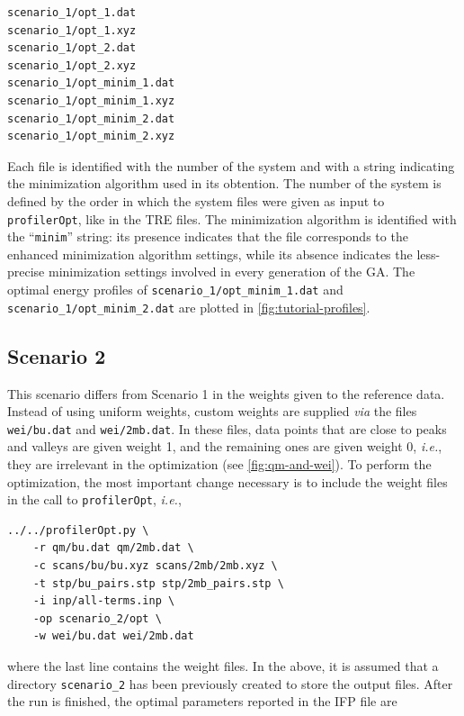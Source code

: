 \documentclass[10pt,a4paper]{report}
\numberwithin{equation}{section}
\newcommand{\under}{\_}
\newcommand{\profileropt}[0]{\texttt{profilerOpt}}
\begin{document}
\begin{lstlisting}
scenario_1/opt_1.dat
scenario_1/opt_1.xyz
scenario_1/opt_2.dat
scenario_1/opt_2.xyz
scenario_1/opt_minim_1.dat
scenario_1/opt_minim_1.xyz
scenario_1/opt_minim_2.dat
scenario_1/opt_minim_2.xyz
\end{lstlisting}\vspace{-2ex}\par
\noindent Each file is identified with the number of the system and
with a string indicating the minimization algorithm used in its
obtention.
%
The number of the system is defined by the order in which the system
files were given as input to \profileropt{}, like in the TRE files.
%
The minimization algorithm is identified with the ``\texttt{minim}''
string:
%
its presence indicates that the file corresponds to the enhanced
minimization algorithm settings, while
%
its absence indicates the less-precise minimization settings involved
in every generation of the GA.
%
The optimal energy profiles of
\texttt{scenario\under{}1/opt\under{}minim\under{}1.dat} and
\texttt{scenario\under{}1/opt\under{}minim\under{}2.dat} are plotted
in \autoref{fig:tutorial-profiles}.

\subsection{Scenario 2}
\label{sec:tutorial-scenario-2}

This scenario differs from Scenario 1 in the weights given to the
reference data.
%
Instead of using uniform weights, custom weights are supplied
\textit{via} the files \texttt{wei/bu.dat} and \texttt{wei/2mb.dat}.
%
In these files, data points that are close to peaks and valleys are
given weight 1, and the remaining ones are given weight 0,
\textit{i.e.}, they are irrelevant in the optimization (see
\autoref{fig:qm-and-wei}).
%
To perform the optimization, the most important change necessary is to
include the weight files in the call to \profileropt, \textit{i.e.},

\begin{lstlisting}
../../profilerOpt.py \
    -r qm/bu.dat qm/2mb.dat \
    -c scans/bu/bu.xyz scans/2mb/2mb.xyz \
    -t stp/bu_pairs.stp stp/2mb_pairs.stp \
    -i inp/all-terms.inp \
    -op scenario_2/opt \
    -w wei/bu.dat wei/2mb.dat
\end{lstlisting}\vspace{-2ex}\par

\noindent where the last line contains the weight files.
%
In the above, it is assumed that a directory
\texttt{scenario\under{}2} has been previously created to store the
output files.
%
After the run is finished, the optimal parameters reported in the IFP
file are
\end{document}
